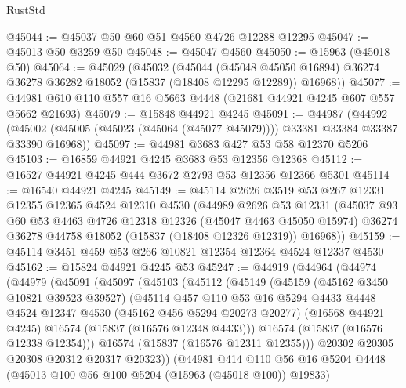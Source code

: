 \begin{lexlean}{RustStd}
\begin{coremodule}
@45044 := @45037 @50 @60 @51 @4560 @4726 @12288 @12295
@45047 := @45013 @50 @3259 @50
@45048 := @45047 @4560
@45050 := @15963 (@45018 @50)
@45064 := @45029
    (@45032
      (@45044
        (@45048 @45050 @16894)
        @36274
        @36278
        @36282
        @18052
        (@15837 (@18408 @12295 @12289))
        @16968))
@45077 := @44981 @610 @110 @557 @16 @5663 @4448 (@21681 @44921 @4245 @607 @557 @5662 @21693)
@45079 := @15848 @44921 @4245
@45091 := @44987
    (@44992 (@45002 (@45005 (@45023 (@45064 (@45077 @45079)))) @33381 @33384 @33387 @33390 @16968))
@45097 := @44981 @3683 @427 @53 @58 @12370 @5206
@45103 := @16859 @44921 @4245 @3683 @53 @12356 @12368
@45112 := @16527 @44921 @4245 @444 @3672 @2793 @53 @12356 @12366 @5301
@45114 := @16540 @44921 @4245
@45149 := @45114
    @2626
    @3519
    @53
    @267
    @12331
    @12355
    @12365
    @4524
    @12310
    @4530
    (@44989
      @2626
      @53
      @12331
      (@45037
        @93
        @60
        @53
        @4463
        @4726
        @12318
        @12326
        (@45047 @4463 @45050 @15974)
        @36274
        @36278
        @44758
        @18052
        (@15837 (@18408 @12326 @12319))
        @16968))
@45159 := @45114 @3451 @459 @53 @266 @10821 @12354 @12364 @4524 @12337 @4530
@45162 := @15824 @44921 @4245 @53
@45247 := @44919
    (@44964
      (@44974
        (@44979
          (@45091
            (@45097
              (@45103
                (@45112
                  (@45149
                    (@45159
                      (@45162 @3450 @10821 @39523 @39527)
                      (@45114
                        @457
                        @110
                        @53
                        @16
                        @5294
                        @4433
                        @4448
                        @4524
                        @12347
                        @4530
                        (@45162 @456 @5294 @20273 @20277)
                        (@16568 @44921 @4245)
                        @16574
                        (@15837 (@16576 @12348 @4433)))
                      @16574
                      (@15837 (@16576 @12338 @12354)))
                    @16574
                    (@15837 (@16576 @12311 @12355)))
                  @20302
                  @20305
                  @20308
                  @20312
                  @20317
                  @20323))
              (@44981
                @414
                @110
                @56
                @16
                @5204
                @4448
                (@45013 @100 @56 @100 @5204 (@15963 (@45018 @100)) @19833)

\end{coremodule}
\end{lexlean}
